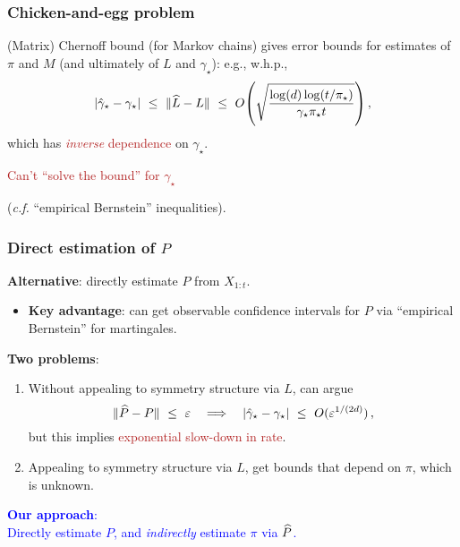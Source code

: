\documentclass[11pt,compress,blue4]{beamer}
\newcommand{\BLUE}[1]{\textcolor{blue}{#1}}
\newcommand{\FIREBRICK}[1]{\textcolor{firebrick}{#1}}
\newcommand\fns\footnotesize
\newcommand\pimin{\ensuremath{\pi_{\star}}}
\newcommand\gap{\ensuremath{\gamma_{\star}}}
\newcommand\gaphat{\ensuremath{\hat{\gamma}_{\star}}}
\begin{document}

\begin{frame}
  \frametitle{Chicken-and-egg problem}

  (Matrix) Chernoff bound {\fns(for Markov chains)} gives error bounds
  for estimates of $\pi$ and $M$ (and ultimately of $L$ and $\gap$):
  e.g., w.h.p.,
  \[
    \abs{\gaphat-\gap}
    \ \leq \
    \norm{\wh L - L}
    \ \leq \
    O\Parens{
      \sqrt{\frac{\log(d)\log(t/\pimin)}{\gap\pimin t}}
    }
    \,,
  \]
  which has \FIREBRICK{\emph{inverse} dependence} on $\gap$.

  \begin{center}
    \FIREBRICK{%
      Can't ``solve the bound'' for $\gap$
    }

    {\fns(\emph{c.f.} ``empirical Bernstein'' inequalities)}.
  \end{center}

\end{frame}


\begin{frame}
  \frametitle{Direct estimation of $P$}

  \textbf{Alternative}: directly estimate $P$ from $X_{1:t}$.

  \begin{itemize}
    \item
      \textbf{Key advantage}: can get observable confidence intervals
      for $P$ via ``empirical Bernstein'' for martingales.

  \end{itemize}

  \textbf{Two problems}:
  \begin{enumerate}
    \item
      Without appealing to symmetry structure via $L$, can argue
      \[
        \norm{\wh{P} - P} \ \leq \ \veps
        \quad\Longrightarrow\quad
        \abs{\gaphat - \gap} \ \leq \ O(\veps^{1/(2d)})
        \,,
      \]
      but this implies \FIREBRICK{exponential slow-down in rate}.

      \medskip

    \item
      Appealing to symmetry structure via $L$, get bounds that depend
      on $\pi$, which is unknown.

  \end{enumerate}

  \begin{center}
    \BLUE{%
      \textbf{Our approach}: \\
      Directly estimate $P$, and \emph{indirectly} estimate $\pi$ via
      $\widehat P$.
    }
  \end{center}

\end{frame}
\end{document}
